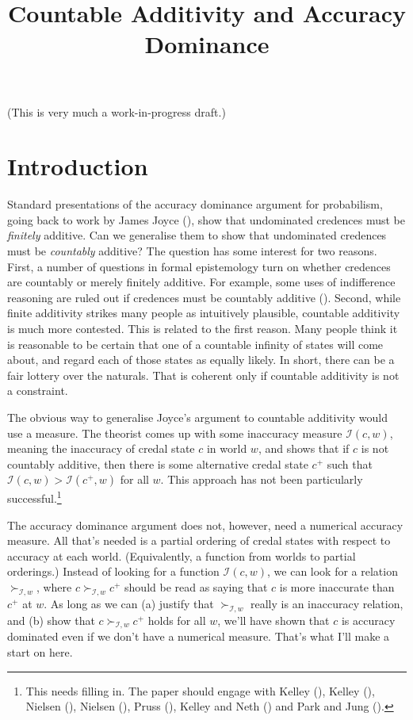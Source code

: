 \documentclass[
  11pt,
  letterpaper,
  DIV=11,
  numbers=noendperiod,
  twoside]{scrartcl}
\title{Countable Additivity and Accuracy Dominance}
\author{}
\date{}
\theoremstyle{definition}
\theoremstyle{plain}
\theoremstyle{plain}
\theoremstyle{remark}
\begin{document}
\maketitle


(This is very much a work-in-progress draft.)

\section{Introduction}\label{introduction}

Standard presentations of the accuracy dominance argument for
probabilism, going back to work by James Joyce
(), show that undominated credences must
be \emph{finitely} additive. Can we generalise them to show that
undominated credences must be \emph{countably} additive? The question
has some interest for two reasons. First, a number of questions in
formal epistemology turn on whether credences are countably or merely
finitely additive. For example, some uses of indifference reasoning are
ruled out if credences must be countably additive
(). Second, while finite additivity
strikes many people as intuitively plausible, countable additivity is
much more contested. This is related to the first reason. Many people
think it is reasonable to be certain that one of a countable infinity of
states will come about, and regard each of those states as equally
likely. In short, there can be a fair lottery over the naturals. That is
coherent only if countable additivity is not a constraint.

The obvious way to generalise Joyce's argument to countable additivity
would use a measure. The theorist comes up with some inaccuracy measure
\(\mathcal{I}(c, w)\), meaning the inaccuracy of credal state \(c\) in
world \(w\), and shows that if \(c\) is not countably additive, then
there is some alternative credal state \(c^+\) such that
\(\mathcal{I}(c, w) > \mathcal{I}(c^+, w)\) for all \(w\). This approach
has not been particularly successful.\footnote{This needs filling in.
  The paper should engage with Kelley (),
  Kelley (), Nielsen
  (), Nielsen
  (), Pruss
  (), Kelley and Neth
  () and Park and Jung
  ().}

The accuracy dominance argument does not, however, need a numerical
accuracy measure. All that's needed is a partial ordering of credal
states with respect to accuracy at each world. (Equivalently, a function
from worlds to partial orderings.) Instead of looking for a function
\(\mathcal{I}(c, w)\), we can look for a relation
\(\succ_{\mathcal{I}, w}\), where \(c \succ_{\mathcal{I}, w} c^+\)
should be read as saying that \(c\) is more inaccurate than \(c^+\) at
\(w\). As long as we can (a) justify that \(\succ_{\mathcal{I}, w}\)
really is an inaccuracy relation, and (b) show that
\(c \succ_{\mathcal{I}, w} c^+\) holds for all \(w\), we'll have shown
that \(c\) is accuracy dominated even if we don't have a numerical
measure. That's what I'll make a start on here.
\end{document}
